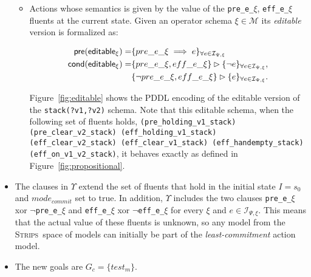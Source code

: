 \documentclass{article}
\newcommand{\pre}{\mathsf{pre}}     %
\newcommand{\cond}{\mathsf{cond}}   %
\newcommand{\strips}{\textsc{Strips}}
\begin{document}
\begin{itemize}
\begin{itemize}
      \item Actions whose semantics is given by the value of the {\tt\small pre\_e\_$\xi$}, {\tt\small eff\_e\_$\xi$} fluents at the current state. Given an operator schema $\xi\in\mathcal{M}$ its {\em editable} version is formalized as:
\begin{small}  
\begin{align*}
\hspace*{7pt}\pre(\mathsf{editable_{\xi}})=&\{pre\_e\_\xi\implies e\}_{\forall e\in{\mathcal I}_{\Psi,\xi}}\\
\cond(\mathsf{editable_{\xi}})=&\{pre\_e\_\xi, eff\_e\_\xi\}\rhd\{\neg e\}_{\forall e\in{\mathcal I}_{\Psi,\xi}},\\
&\{\neg pre\_e\_\xi, eff\_e\_\xi\}\rhd\{e\}_{\forall e\in{\mathcal I}_{\Psi,\xi}}.
\end{align*}
\end{small}
Figure~\ref{fig:editable} shows the PDDL encoding of the editable version of the {\tt\small stack(?v1,?v2)} schema. Note that this editable schema, when the following set of fluents holds, {\tiny\tt (pre\_holding\_v1\_stack) (pre\_clear\_v2\_stack) (eff\_holding\_v1\_stack) (eff\_clear\_v2\_stack) (eff\_clear\_v1\_stack) (eff\_handempty\_stack) (eff\_on\_v1\_v2\_stack)}, it behaves exactly as defined in Figure~\ref{fig:propositional}.     
\end{itemize}

\item The clauses in $\Upsilon$ extend the set of fluents that hold in the initial state $I=s_0$ and $mode_{commit}$ set to true. In addition, $\Upsilon$ includes the two clauses {\tt\small pre\_e\_$\xi$} xor {\tt\small $\neg$pre\_e\_$\xi$} and {\tt\small eff\_e\_$\xi$} xor {\tt\small $\neg$eff\_e\_$\xi$} for every $\xi$ and $e\in{\mathcal I}_{\Psi,\xi}$. This means that the actual value of these fluents is unknown, so any model from the \strips\ space of models can initially be part of the {\em least-commitment} action model. 

\item The new goals are $G_c=\{test_m\}$.
\end{itemize}
\end{document}
